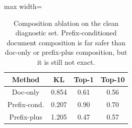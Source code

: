\begin{table}[t]
\centering
\footnotesize
\begin{adjustbox}{max width=\linewidth}
\begin{tabular}{cccc}
\toprule
Method & KL & Top-1 & Top-10 \\
\midrule
Doc-only & 0.854 & 0.61 & 0.56 \\
Prefix-cond. & 0.207 & 0.90 & 0.70 \\
Prefix-plus & 1.205 & 0.47 & 0.57 \\
\bottomrule
\end{tabular}
\end{adjustbox}
\caption{Composition ablation on the clean diagnostic set. Prefix-conditioned document composition is far safer than doc-only or prefix-plus composition, but it is still not exact.}
\label{tab:composition}
\end{table}
